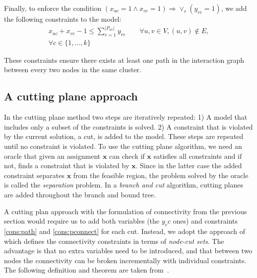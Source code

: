 \documentclass[conference]{IEEEtran}
\newcommand{\NDT}[1]{\todo[bordercolor=ghue,linecolor=ghue,color=ghue!40]{Tias: #1}}
\begin{document}
Finally, to enforce the condition $(x_{uc}=1 \land x_{vc}=1) \Rightarrow \lor_{r} (y_{rc}=1)$, we add the following constraints to the model:
%
\begin{multline}
x_{uc} + x_{vc} -1 \leq \sum_{r=1}^{|P_{uv}|} y_{rc} \qquad
\forall u, v \in V, (u, v) \notin E, \\ \forall c \in \{1, \ldots, k\}
\label{cons:pconnect}
\end{multline} 

These constraints ensure there exists at least one path in the interaction graph between every two nodes in the same cluster.

\subsection{A cutting plane approach}
\label{sec:bnc}

 In the cutting plane method two steps are iteratively repeated: 1) A model that includes only a subset of the constraints is solved. 2) A constraint that is violated by the current solution, a cut, is added to the model. These steps are repeated until no constraint is violated. To use the cutting plane algorithm, we need an oracle that given an assignment $\mathbf{x}$ can check if $\mathbf{x}$ satisfies all constraints and if not, finds a constraint that is violated by $\mathbf{x}$. Since in the latter case the added constraint separates $\mathbf{x}$ from the feasible region, the problem solved by the oracle is called the \emph{separation} problem.
 In a \emph{branch and cut} algorithm, cutting planes are added throughout the branch and bound tree. 
 

 A cutting plan approach with the formulation of connectivity from the previous section would require us to add both variables (the $y_rc$ ones) and constraints \eqref{cons:path} and \eqref{cons:pconnect} for each cut.
Instead, we adopt the approach of ~\cite{CarvajalCGVW13} which defines the connectivity constraints in terms of \emph{node-cut sets}. The advantage is that no extra variables need to be introduced, and that between two nodes the connectivity can be broken incrementally with individual constraints. The following definition and theorem are taken from~\cite{CarvajalCGVW13}.
\end{document}
